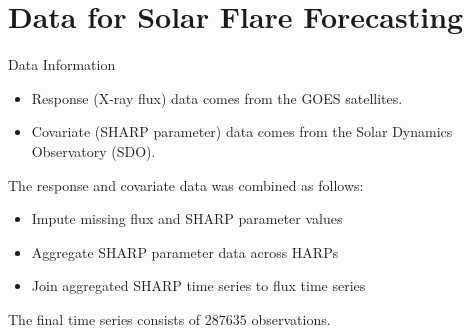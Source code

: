 \documentclass{beamer}
\begin{document}
\section{Data for Solar Flare Forecasting}

\begin{frame}{Data Information}
    \begin{itemize}
        \item Response (X-ray flux) data comes from the GOES satellites.
        \item Covariate (SHARP parameter) data comes from the Solar Dynamics Observatory (SDO).
    \end{itemize}

    The response and covariate data was combined as follows:
    \begin{itemize}
        \item Impute missing flux and SHARP parameter values
        \item Aggregate SHARP parameter data across HARPs 
        \item Join aggregated SHARP time series to flux time series
    \end{itemize}
    The final time series consists of $\num[group-separator={,}]{287635}$ observations.
\end{frame}
\end{document}
